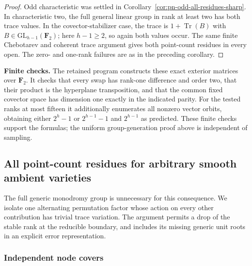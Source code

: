 \begin{proof}
Odd characteristic was settled in
Corollary~\ref{cor:pn-odd-all-residues-sharp}.  In characteristic
two, the full general linear group in rank at least two
has both trace values.  In the covector-stabilizer case,
the trace is $1+\operatorname{Tr}(B)$ with
$B\in\mathrm{GL}_{h-1}(\mathbf F_2)$; here $h-1\geq2$,
so again both values occur.  The same finite Chebotarev
and coherent trace argument gives both point-count
residues in every open.  The zero- and one-rank failures
are as in the preceding corollary.
\end{proof}

\par\smallskip\noindent\textbf{Finite checks.}
The retained program
 constructs
these exact exterior matrices over $\mathbf F_2$.
It checks that every swap has rank-one difference and
order two, that their product is the hyperplane
transposition, and that the common fixed covector space
has dimension one exactly in the indicated parity.
For the tested ranks at most fifteen it additionally
enumerates all nonzero vector orbits, obtaining either
$2^h-1$ or $2^{h-1}-1$ and $2^{h-1}$ as predicted.
These finite checks support the formulas; the uniform
group-generation proof above is independent of sampling.

\subsection{All point-count residues for arbitrary smooth ambient varieties}
\label{subsec:general-X-residues}

The full generic monodromy group is unnecessary for this
consequence.  We isolate one alternating permutation factor
whose action on every other contribution has trivial trace
variation.  The argument permits a drop of the stable rank
at the reducible boundary, and includes its missing generic
unit roots in an explicit error representation.

\subsubsection{Independent node covers}

